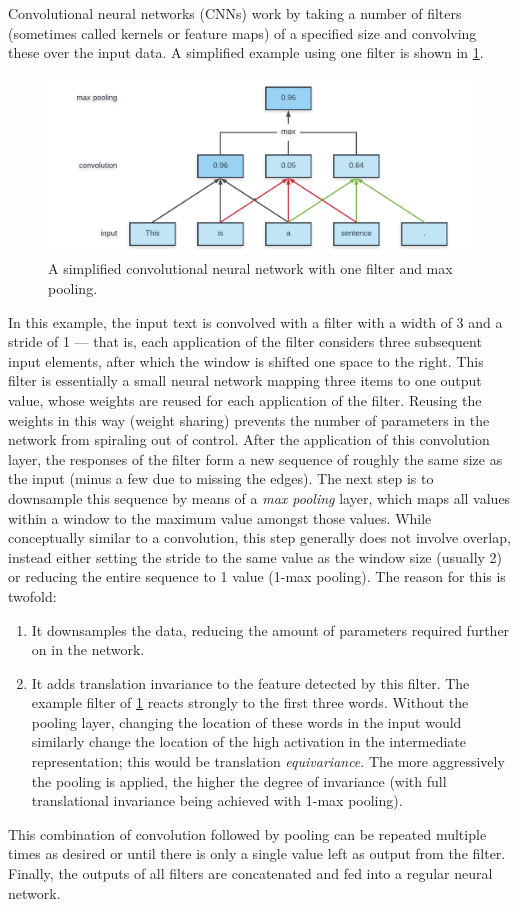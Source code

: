 Convolutional neural networks (CNNs) work by taking a number of filters
(sometimes called kernels or feature maps) of a specified size and convolving
these over the input data. A simplified example using one filter is shown in
\cref{fig:cnn}.
\begin{figure}[tb]
  \centering
  \includegraphics[width=\textwidth]{figures/cnn.pdf}
  \caption{A simplified convolutional neural network with one filter and
  max pooling.\label{fig:cnn}}
\end{figure}
In this example, the input text is convolved with a filter with a width of 3 and
a stride of 1 --- that is, each application of the filter considers three
subsequent input elements, after which the window is shifted one space to the
right. This filter is essentially a small neural network mapping three items to
one output value, whose weights are reused for each application of the filter.
Reusing the weights in this way (weight sharing) prevents the number of
parameters in the network from spiraling out of control.
\citep{lecun1995convolutional} After the application of this convolution layer,
the responses of the filter form a new sequence of roughly the same size as the
input (minus a few due to missing the edges). The next step is to downsample
this sequence by means of a \emph{max pooling} layer, which maps all values
within a window to the maximum value amongst those values. While conceptually
similar to a convolution, this step generally does not involve overlap, instead
either setting the stride to the same value as the window size (usually 2) or
reducing the entire sequence to 1 value (1-max pooling). The reason for this is
twofold:
\begin{enumerate}
\item It downsamples the data, reducing the amount of parameters
  required further on in the network.
\item It adds translation invariance to the feature detected by this filter. The
  example filter of \cref{fig:cnn} reacts strongly to the
  first three words. Without the pooling layer, changing the
  location of these words in the input would similarly change the
  location of the high activation in the intermediate representation; this would
  be translation \emph{equivariance}. The more aggressively the pooling is
  applied, the higher the degree of invariance (with full translational
  invariance being achieved with 1-max pooling).
\end{enumerate}
This combination of convolution followed by pooling can be repeated multiple
times as desired or until there is only a single value left as output from the
filter. Finally, the outputs of all filters are concatenated and fed into a
regular neural network.

